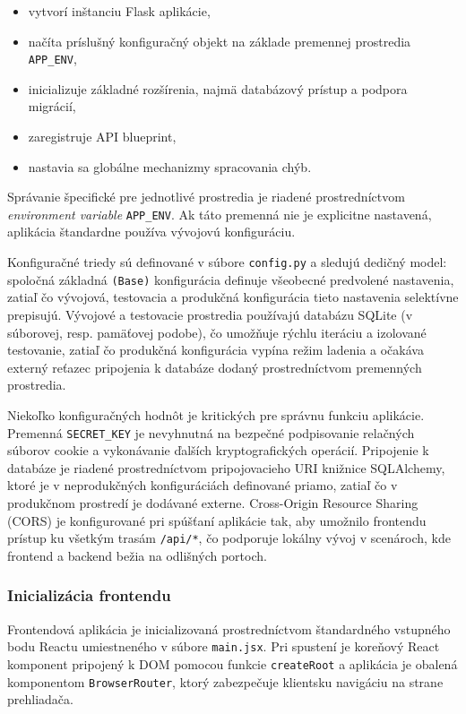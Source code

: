 \begin{itemize}
    \item vytvorí inštanciu Flask aplikácie,
    \item načíta príslušný konfiguračný objekt na základe premennej prostredia
    \texttt{APP\_ENV},
    \item inicializuje základné rozšírenia, najmä databázový prístup a podpora migrácií,
    \item zaregistruje API blueprint,
    \item nastavia sa globálne mechanizmy spracovania chýb.
\end{itemize}

Správanie špecifické pre jednotlivé prostredia je riadené prostredníctvom \textit{environment variable} \texttt{APP\_ENV}. Ak táto premenná nie je explicitne nastavená, aplikácia štandardne používa vývojovú konfiguráciu. 

Konfiguračné triedy sú definované v súbore \texttt{config.py} a sledujú dedičný model: spoločná základná \texttt{(Base)} konfigurácia definuje všeobecné predvolené nastavenia, zatiaľ čo vývojová, testovacia a produkčná konfigurácia tieto nastavenia selektívne prepisujú. Vývojové a testovacie prostredia používajú databázu SQLite (v súborovej, resp. pamäťovej podobe), čo umožňuje rýchlu iteráciu a izolované testovanie, zatiaľ čo produkčná konfigurácia vypína režim ladenia a očakáva externý reťazec pripojenia k databáze dodaný prostredníctvom premenných prostredia.

Niekoľko konfiguračných hodnôt je kritických pre správnu funkciu aplikácie. Premenná \texttt{SECRET\_KEY} je nevyhnutná na bezpečné podpisovanie relačných súborov cookie a vykonávanie ďalších kryptografických operácií. Pripojenie k databáze je riadené prostredníctvom pripojovacieho URI knižnice SQLAlchemy, ktoré je v neprodukčných konfiguráciách definované priamo, zatiaľ čo v produkčnom prostredí je dodávané externe. Cross-Origin Resource Sharing (CORS) je konfigurované pri spúšťaní aplikácie tak, aby umožnilo frontendu prístup ku všetkým trasám \texttt{/api/*}, čo podporuje lokálny vývoj v scenároch, kde frontend a backend bežia na odlišných portoch.

\subsubsection{Inicializácia frontendu}

Frontendová aplikácia je inicializovaná prostredníctvom štandardného vstupného bodu Reactu umiestneného v súbore \texttt{main.jsx}. Pri spustení je koreňový React komponent pripojený k DOM pomocou funkcie \texttt{createRoot} a aplikácia je obalená komponentom \texttt{BrowserRouter}, ktorý zabezpečuje klientsku navigáciu na strane prehliadača.

